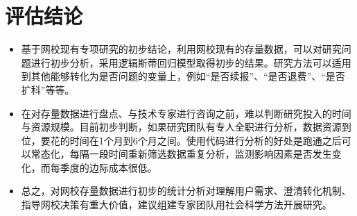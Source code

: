 \documentclass[]{article}
\begin{document}
\section{评估结论}\label{ux8bc4ux4f30ux7ed3ux8bba}

\begin{itemize}
\item
  基于网校现有专项研究的初步结论，利用网校现有的存量数据，可以对研究问题进行初步分析，采用逻辑斯蒂回归模型取得初步的结果。研究方法可以适用到其他能够转化为是否问题的变量上，例如``是否续报''、``是否退费''、``是否扩科''等等。
\item
  在对存量数据进行盘点、与技术专家进行咨询之前，难以判断研究投入的时间与资源规模。目前初步判断，如果研究团队有专人全职进行分析，数据资源到位，要花的时间在1个月到6个月之间。使用代码进行分析的好处是跑通之后可以常态化，每隔一段时间重新筛选数据重复分析，监测影响因素是否发生变化，而每季度的边际成本很低。
\item
  总之，对网校存量数据进行初步的统计分析对理解用户需求、澄清转化机制、指导网校决策有重大价值，建议组建专家团队用社会科学方法开展研究。
\end{itemize}
\end{document}
